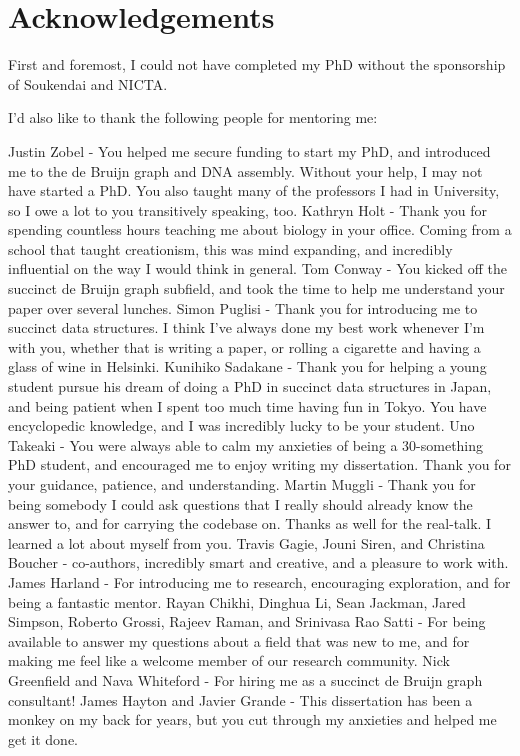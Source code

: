 \chapter*{Acknowledgements}

First and foremost, I could not have completed my PhD without the sponsorship of Soukendai and NICTA.

I’d also like to thank the following people for mentoring me:

Justin Zobel - You helped me secure funding to start my PhD, and introduced me to the de Bruijn graph and DNA assembly. Without your help, I may not have started a PhD. You also taught many of the professors I had in University, so I owe a lot to you transitively speaking, too.
Kathryn Holt - Thank you for spending countless hours teaching me about biology in your office. Coming from a school that taught creationism, this was mind expanding, and incredibly influential on the way I would think in general.
Tom Conway - You kicked off the succinct de Bruijn graph subfield, and took the time to help me understand your paper over several lunches.
Simon Puglisi - Thank you for introducing me to succinct data structures. I think I’ve always done my best work whenever I’m with you, whether that is writing a paper, or rolling a cigarette and having a glass of wine in Helsinki.
Kunihiko Sadakane - Thank you for helping a young student pursue his dream of doing a PhD in succinct data structures in Japan, and being patient when I spent too much time having fun in Tokyo. You have encyclopedic knowledge, and I was incredibly lucky to be your student.
Uno Takeaki - You were always able to calm my anxieties of being a 30-something PhD student, and encouraged me to enjoy writing my dissertation. Thank you for your guidance, patience, and understanding.
Martin Muggli - Thank you for being somebody I could ask questions that I really should already know the answer to, and for carrying the codebase on. Thanks as well for the real-talk. I learned a lot about myself from you.
Travis Gagie, Jouni Siren, and Christina Boucher - co-authors, incredibly smart and creative, and a pleasure to work with.
James Harland - For introducing me to research, encouraging exploration, and for being a fantastic mentor.
Rayan Chikhi, Dinghua Li, Sean Jackman, Jared Simpson, Roberto Grossi, Rajeev Raman, and Srinivasa Rao Satti - For being available to answer my questions about a field that was new to me, and for making me feel like a welcome member of our research community.
Nick Greenfield and Nava Whiteford - For hiring me as a succinct de Bruijn graph consultant!
James Hayton and Javier Grande - This dissertation has been a monkey on my back for years, but you cut through my anxieties and helped me get it done.

